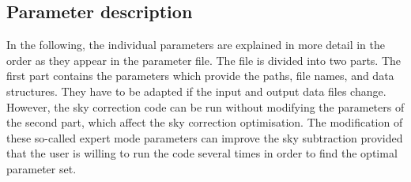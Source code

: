 \subsection{Parameter description}\label{sec:params}
In the following, the individual parameters are explained in more detail in the
order as they appear in the parameter file. The file is divided into two parts.
The first part contains the parameters which provide the paths, file names, and
data structures. They have to be adapted if the input and output data files
change. However, the sky correction code can be run without modifying the
parameters of the second part, which affect the sky correction optimisation.
The modification of these so-called expert mode parameters can improve the sky
subtraction provided that the user is willing to run the code several times in
order to find the optimal parameter set.

